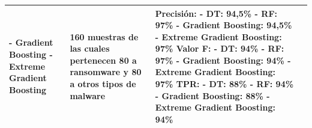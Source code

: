 {\begin{longtable}{|p{}|p{}|p{}|p{}|}
- Gradient Boosting \newline
- Extreme Gradient Boosting \newline&
 160 muestras de las cuales pertenecen 80 a ransomware y 80 a otros tipos de malware &
Precisión: \newline
- \gls{DT}: 94,5\% \newline
- \gls{RF}: 97\% \newline
- Gradient Boosting: 94,5\% \newline
- Extreme Gradient Boosting: 97\% \newline
Valor F: \newline
- \gls{DT}: 94\% \newline
- \gls{RF}: 97\% \newline
- Gradient Boosting: 94\% \newline
- Extreme Gradient Boosting: 97\% \newline
\gls{TPR}: \newline
- \gls{DT}: 88\% \newline
- \gls{RF}: 94\% \newline
- Gradient Boosting: 88\% \newline
- Extreme Gradient Boosting: 94\% \newline
\\ \hline


\end{longtable}}



